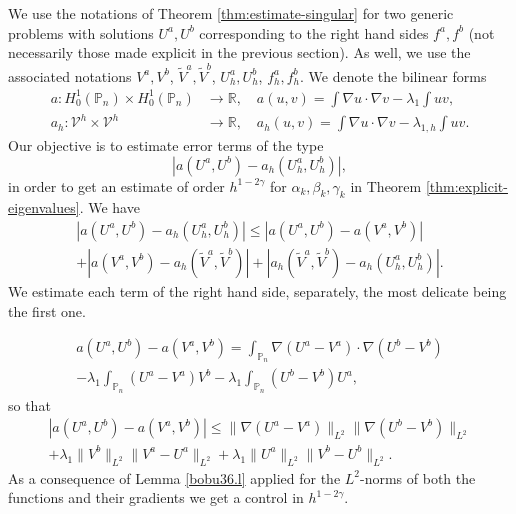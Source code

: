 \documentclass[JEP,XML,SOM,Unicode,ThmDefs,NoFloatCountersInSection,published]{cedram}
\theoremstyle{plain}
\theoremstyle{definition}
\newcommand{\aaa}{a}
\newcommand{\bbb}{b}
\let\Bbb\mathbb
\def\R{\mathbb{R}}
\def\Pp{{\mathbb{P}_n}}
\newcommand{\lb}{\lambda}
\begin{document}
We use the notations of Theorem \ref{thm:estimate-singular} for two generic problems with solutions $U^\aaa, U^\bbb$ corresponding to the right hand sides $f^\aaa, f^\bbb$ (not necessarily those made explicit in the previous section). As well, we use the associated notations $V^\aaa, V^\bbb$, $\tilde V^\aaa, \tilde V^\bbb$, $U_h^\aaa, U_h^\bbb$, $f_h^\aaa, f_h^\bbb$. We denote the bilinear forms\vspace*{-3pt}
\begin{align*}
a: H^1_0(\Bbb P_n) \times H^1_0(\Bbb P_n) &\to \R,\quad a(u,v)= \int \nabla u \cdot \nabla v -\lb_1 \int uv,\\
a_h: {\mathcal V}^h \times{\mathcal V}^h &\to \R, \quad a_h(u,v)= \int \nabla u \cdot \nabla v -\lb_{1,h} \int uv.
\end{align*}
Our objective is to estimate error terms of the type\vspace*{-3pt}
\[
|a(U^\aaa,U^\bbb)-a_h(U_h^\aaa, U_h^\bbb)|,
\]
in order to get an estimate of order $h^{1-2\gamma}$ for $\alpha_k,\beta_k,\gamma_k$ in Theorem \ref{thm:explicit-eigenvalues}.
We have\vspace*{-3pt}
\begin{multline}
\label{eq:estimate-a(U,V)}
|a(U^\aaa,U^\bbb)-a_h(U_h^\aaa, U_h^\bbb)|
\le
|a(U^\aaa,U^\bbb)-a(V^\aaa, V^\bbb)|\\
+ |a(V^\aaa,V^\bbb)-a_h(\tilde V^\aaa, \tilde V^\bbb)|+ |a_h(\tilde V^\aaa, \tilde V^\bbb)-a_h(U_h^\aaa, U_h^\bbb)|.
\end{multline}
We estimate each term of the right hand side, separately, the most delicate being the first one.

\vspace*{-1.8\baselineskip}
\begin{multline*}
a(U^a,U^b)-a(V^a, V^b)= \int_\Pp \nabla (U^a-V^a)\cdot \nabla (U^\bbb-V^\bbb) \\[-8pt]
- \lb_1 \int_\Pp (U^\aaa-V^\aaa) V^\bbb- \lb_1 \int_\Pp (U^\bbb-V^\bbb) U^\aaa,
\end{multline*}
so that\vspace*{-5pt}
\begin{multline*}
|a(U^\aaa,U^\bbb)-a(V^\aaa, V^\bbb)|
\leq \| \nabla (U^\aaa-V^\aaa)\|_{L^2} \| \nabla (U^\bbb-V^\bbb)\|_{L^2}\\
+ \lb_1\|V^\bbb\|_{L^2} \|V^\aaa-U^\aaa\|_{L^2}+ \lb_1\|U^\aaa\|_{L^2} \|V^\bbb-U^\bbb\|_{L^2}.\end{multline*}
As a consequence of Lemma \ref{bobu36.l} applied for the $L^2$-norms of both the functions and their gradients we get a control in $h^{1-2\gamma}$.
\end{document}
